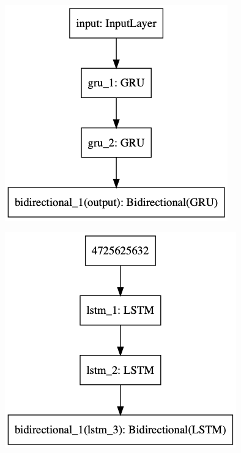 \begin{figure}[h!]
\centering
\begin{minipage}{.5\textwidth}
  \centering
  \includegraphics[width=1\linewidth]{./img/gru_architecture.png}
  \label{fig:gru_architecture}
\end{minipage}%
\begin{minipage}{.5\textwidth}
  \centering
  \includegraphics[width=1\linewidth]{./img/lstm_architecture.png}
  \label{fig:lstm_architecture}
\end{minipage}
\end{figure}\label{fig:nn_architectures}



